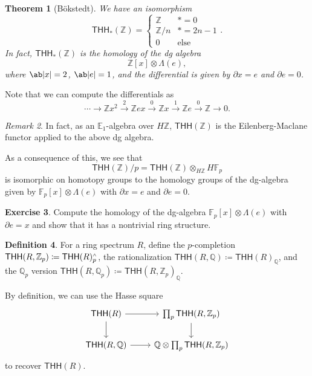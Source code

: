 \documentclass[10pt, oneside]{memoir}
\newtheorem{thm}{Theorem}[subsection]
\theoremstyle{definition}
\newtheorem{defn}[thm]{Definition}
\newtheorem{exer}[thm]{Exercise}
\theoremstyle{remark}
\newtheorem{rmk}[thm]{Remark}
\theoremstyle{plain}
\theoremstyle{definition}
\theoremstyle{remark}
\newcommand{\Z}{\mathbb{Z}}
\newcommand{\Q}{\mathbb{Q}}
\newcommand{\E}{\mathbb{E}}
\newcommand{\F}{\mathbb{F}}
\newcommand{\ms}[1]{\mathsf{#1}}
\newcommand{\1}{\mathbf{1}}
\newcommand{\2}{\mathbf{2}}
\newcommand{\3}{\mathbf{3}}
\newcommand{\THH}{\ms{THH}}
\newcommand{\sw}{\mathsmaller{\wedge}}
\begin{document}
\begin{thm}[B\"okstedt]\label{thm:thhofz}
    We have an isomorphism
    \[ \THH_*(\Z) = \begin{cases}
        \Z & * = 0 \\
        \Z/n & * = 2n-1 \\
        0 & \text{else}
    \end{cases}. \]
    In fact, \(\THH_*(\Z) \) is the homology of the dg algebra
    \[ \Z[x] \otimes \Lambda(e), \]
    where \(\ab|x| = 2 \), \(\ab|e| = 1 \), and the differential is given by \(\partial x = e \) and \(\partial e = 0 \).
\end{thm}

Note that we can compute the differentials as
\[ \cdots \to \Z x^2 \xrightarrow{2} \Z ex \xrightarrow{0} \Z x \xrightarrow{1} \Z e \xrightarrow{0} \Z \to 0. \]

\begin{rmk}
    In fact, as an \(\E_1 \)-algebra over \(H \Z \), \(\THH(\Z) \) is the Eilenberg-Maclane functor applied to the above dg algebra.
\end{rmk}

As a consequence of this, we see that
\[ \THH(\Z) /p = \THH(\Z) \otimes_{H \Z} H \F_p \]
is isomorphic on homotopy groups to the homology groups of the dg-algebra given by \(\F_p[x] \otimes \Lambda(e) \) with \(\partial x = e \) and \(\partial e = 0 \).

\begin{exer}
    Compute the homology of the dg-algebra \(\F_p[x] \otimes \Lambda(e) \) with \(\partial e = x \) and show that it has a nontrivial ring structure.
\end{exer}

\begin{defn}
    For a ring spectrum \(R \), define the \(p \)-completion \(\THH(R, \Z_p) \coloneqq \THH(R)_p^{\sw} \), the rationalization \(\THH(R, \Q) \coloneqq \THH(R)_{\Q} \), and the \(\Q_p \) version \(\THH(R, \Q_p) \coloneqq \THH(R, \Z_p)_{\Q} \).
\end{defn}

By definition, we can use the Hasse square
\begin{equation*}
\begin{tikzcd}
    \THH(R) \ar{r} \ar{d} & \prod_p \THH(R, \Z_p) \ar{d} \\
    \THH(R, \Q) \ar{r} & \Q \otimes \prod_p \THH(R, \Z_p)
\end{tikzcd}
\end{equation*}
to recover \(\THH(R) \).
\end{document}
